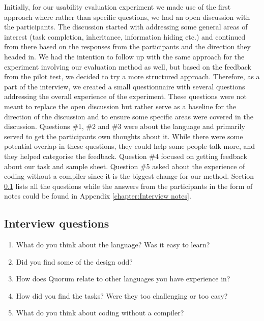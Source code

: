Initially, for our usability evaluation experiment we made use of the first approach where rather than specific questions, we had an open discussion with the participants. The discussion started with addressing some general areas of interest (task completion, inheritance, information hiding etc.) and continued from there based on the responses from the participants and the direction they headed in. We had the intention to follow up with the same approach for the experiment involving our evaluation method as well, but based on the feedback from the pilot test, we decided to try a more structured approach. 
Therefore, as a part of the interview, we created a small questionnaire with several questions addressing the overall experience of the experiment.
These questions were not meant to replace the open discussion but rather serve as a baseline for the direction of the discussion and to ensure some specific areas were covered in the discussion.
Questions \#1, \#2 and \#3 were about the language and primarily served to get the participants own thoughts about it.
While there were some potential overlap in these questions, they could help some people talk more, and they helped categorise the feedback.
Question \#4 focused on getting feedback about our task and sample sheet.
Question \#5 asked about the experience of coding without a compiler since it is the biggest change for our method. Section \ref{subsection:interview questions} lists all the questions while the answers from the participants in the form of notes could be found in Appendix \ref{chapter:Interview notes}.

\subsection{Interview questions}
\label{subsection:interview questions}
\begin{enumerate}
\item What do you think about the language? Was it easy to learn?
\item Did you find some of the design odd?
\item How does Quorum relate to other languages you have experience in?
\item How did you find the tasks? Were they too challenging or too easy?
\item What do you think about coding without a compiler?
\end{enumerate}	